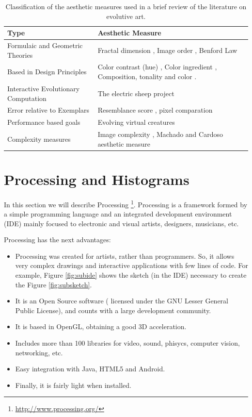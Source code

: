 \documentclass[conference]{IEEEtran}
\begin{document}
\begin{table}[!t] 
\renewcommand{\arraystretch}{1.3} 
\caption{Classification of the aesthetic measures used in a brief review of the literature on evolutive art.} 
\label{table_class} 
\centering
\begin{tabular}{|l|l|}
\hline
Type & Aesthetic Measure \\ \hline
Formulaic and Geometric Theories & Fractal dimension \cite{den2010comparing}, Image order \cite{li2012investigating}, Benford Law \cite{del2005benford}\\ \hline
Based in Design Principles &  Color contrast (hue) \cite{den2012evolving},  Color ingredient \cite{li2012investigating}, Composition, tonality and color \cite{dipaola2009incorporating}.\\ \hline
Interactive Evolutionary Computation & The electric sheep project \cite{draves2006electric} \\ \hline
Error relative to Exemplars &  Resemblance score \cite{dipaola2009incorporating}, pixel comparation \cite{aguilar2008robotic}\\ \hline
Performance based goals & Evolving virtual creatures \cite{sims1994evolving} \\\hline
Complexity measures & Image complexity \cite{li2012investigating}, Machado and Cardoso aesthetic measure \cite{machado1998computing}\\ \hline
\end{tabular}
\end{table}

\section{Processing and Histograms}
\label{sec:processing}
In this section we will describe Processing \footnote{\url{http://www.processing.org/}}. Processing \cite{PROCESSING} is a framework formed by a simple programming language and an integrated development environment (IDE) mainly focused to electronic and visual artists, designers, musicians, etc.

Processing has the next advantages:

\begin{itemize}
\item Processing was created for artists, rather than programmers. So, it allows very complex drawings and interactive applications with few lines of code. For example, Figure \ref{fig:subide} shows the sketch (in the IDE) necessary to create the Figure \ref{fig:subsketch}.
\item It is an Open Source software ( licensed under the GNU Lesser General Public License), and counts with a large development community.
\item It is based in OpenGL, obtaining a good 3D acceleration.
\item Includes more than 100 libraries for video, sound, phisycs, computer vision, networking, etc.
\item Easy integration with Java, HTML5 and Android.
\item Finally, it is fairly light when installed.
\end{itemize}
\end{document}

